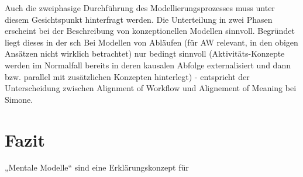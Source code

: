 Auch die zweiphasige Durchführung des Modellierungsprozesses muss unter diesem Gesichtspunkt hinterfragt werden. Die Unterteilung in zwei Phasen erscheint bei der Beschreibung von konzeptionellen Modellen sinnvoll. Begründet liegt dieses in der sch Bei Modellen von Abläufen (für AW relevant, in den obigen Ansätzen nicht wirklich betrachtet) nur bedingt sinnvoll (Aktivitäts-Konzepte werden im Normalfall bereits in deren kausalen Abfolge externalisiert und dann bzw. parallel mit zusätzlichen Konzepten hinterlegt) - entspricht der Unterscheidung zwischen Alignment of Workflow und Alignement of Meaning bei Simone.



\section{Fazit} %
\label{sec:fazit}

„Mentale Modelle“ sind eine Erklärungskonzept für 



